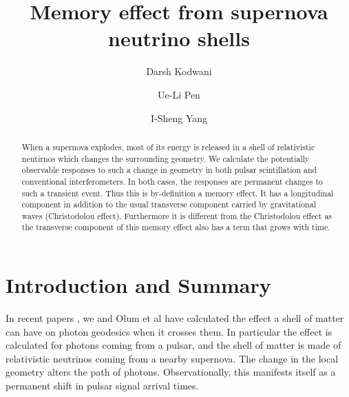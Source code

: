 \documentclass[aps,showpacs,onecolumn,floats,prd,superscriptaddress,nofootinbib]{revtex4-1}
\begin{document}
\title{Memory effect from supernova neutrino shells}

\author{Darsh Kodwani}

\author{Ue-Li Pen}

\author{I-Sheng Yang}

\begin{abstract}
When a supernova explodes, most of its energy is released in a shell of relativistic neutirnos which changes the surrounding geometry.
We calculate the potentially observable responses to such a change in geometry in both pulsar scintillation and conventional interferometers.
In both cases, the responses are permanent changes to such a transient event.
Thus this is by-definition a memory effect.
It has a longitudinal component in addition to the usual transverse component carried by gravitational waves (Christodolou effect). 
Furthermore it is different from the Christodolou effect as the transverse component of this memory effect also has a term that grows with time. 
\end{abstract}

\maketitle

\section{Introduction and Summary}

In recent papers \cite{PhysRevD.93.103006, Olum:2013gza}, we and Olum et al have calculated the effect a shell of matter can have on photon geodesics when it crosses them. 
In particular the effect is calculated for photons coming from a pulsar, and the shell of matter is made of relativistic neutrinos coming from a nearby supernova.
The change in the local geometry alters the path of photons.
Observationally, this manifests itself as a permanent shift in pulsar signal arrival times. 
\end{document}
